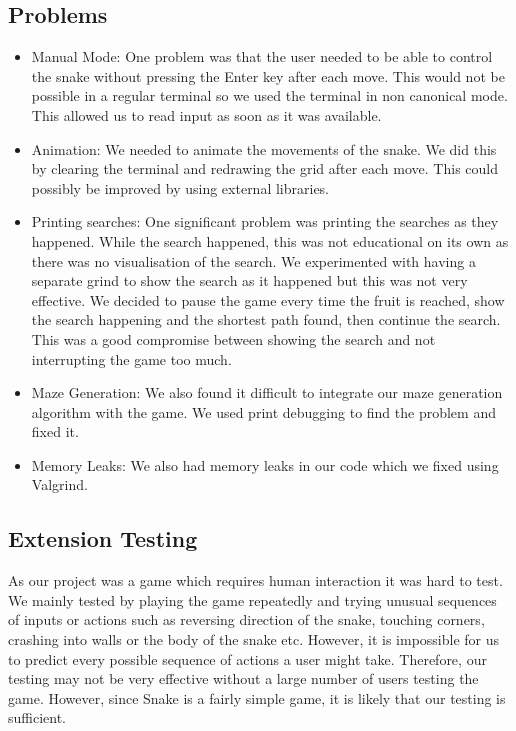 \documentclass[11pt]{article}
\begin{document}
\subsection{Problems}

\begin{itemize}
    \item Manual Mode: One problem was that the user needed to be able to control the snake without pressing the Enter key after each move. This would not be possible in a regular terminal 
    so we used the terminal in non canonical mode. This allowed us to read input as soon as it was available.
    \item Animation: We needed to animate the movements of the snake. We did this by clearing the terminal and redrawing the grid after each move. This could possibly be improved by using external libraries.
    \item Printing searches: One significant problem was printing the searches as they happened. While the search happened, this was not educational on its own as there was no 
    visualisation of the search. We experimented with having a separate grind to show the search as it happened but this was not very effective. We decided to pause the game every time the fruit is reached, 
    show the search happening and the shortest path found, then continue the search. This was a good compromise between showing the search and not interrupting the game too much.
    \item Maze Generation: We also found it difficult to integrate our maze generation algorithm with the game. We used print debugging to find the problem and fixed it.
    \item Memory Leaks: We also had memory leaks in our code which we fixed using Valgrind.
\end{itemize}

\subsection{Extension Testing}
As our project was a game which requires human interaction it was hard to test. We mainly tested by playing the game repeatedly and trying unusual sequences of inputs or actions such as reversing direction of the snake, 
touching corners, crashing into walls or the body of the snake etc. However, it is impossible for us to predict every possible sequence of actions a user might take. Therefore, our testing may not be very effective without 
a large number of users testing the game. However, since Snake is a fairly simple game, it is likely that our testing is sufficient.
\end{document}

